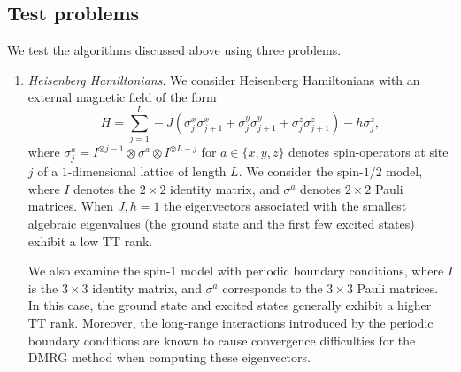 \documentclass[10pt,preprint]{elsarticle}
\begin{document}
\subsection{Test problems}
We test the algorithms discussed above using three problems. 
\begin{enumerate}
\item \textit{Heisenberg Hamiltonians}. 
We consider Heisenberg Hamiltonians with an external magnetic field of the form 
\begin{equation}
\label{Heis}
H = \sum_{j=1}^L -J \left( \sigma_j^x \sigma_{j+1}^x + \sigma_j^y \sigma_{j+1}^y + \sigma_j^z \sigma_{j+1}^z\right) - h  \sigma_j^z,
\end{equation} 
where $\sigma_j^{a} = I^{\otimes j-1} \otimes \sigma^{a} \otimes I^{\otimes L-j}$ for $a \in \{x,y,z\}$ denotes spin-operators at site $j$ of a $1$-dimensional lattice of length $L$. 
%
We consider the spin-$1/2$ model, where $I$ denotes the $2 \times 2$ identity matrix, and $\sigma^a$ denotes $2 \times 2$ Pauli matrices. When $J,h=1$ the eigenvectors associated with the smallest algebraic eigenvalues (the ground state and the first few excited states) exhibit a low TT rank. 

We also examine the spin-1 model with periodic boundary conditions, where $I$ is the $3 \times 3$ identity matrix, and $\sigma^a$ corresponds to the $3 \times 3$ Pauli matrices. In this case, the ground state and excited states generally exhibit a higher TT rank. Moreover, the long-range interactions introduced by the periodic boundary conditions are known to cause convergence difficulties for the DMRG method when computing these eigenvectors. 


\end{enumerate}
\end{document}
